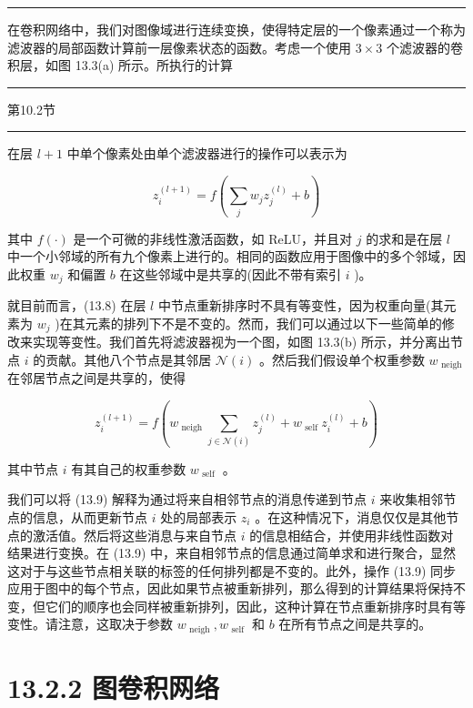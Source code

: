\documentclass[10pt]{article}
\newcommand{\HRule}{\begin{center}\rule{0.9\linewidth}{0.2mm}\end{center}}
\begin{document}
\HRule

在卷积网络中，我们对图像域进行连续变换，使得特定层的一个像素通过一个称为滤波器的局部函数计算前一层像素状态的函数。考虑一个使用 \(3 \times  3\) 个滤波器的卷积层，如图 13.3(a) 所示。所执行的计算

\HRule

第10.2节

\HRule

在层 \(l + 1\) 中单个像素处由单个滤波器进行的操作可以表示为

\[
{z}_{i}^{\left( l + 1\right) } = f\left( {\mathop{\sum }\limits_{j}{w}_{j}{z}_{j}^{\left( l\right) } + b}\right)  \tag{13.8}
\]

其中 \(f\left( \cdot \right)\) 是一个可微的非线性激活函数，如 ReLU，并且对 \(j\) 的求和是在层 \(l\) 中一个小邻域的所有九个像素上进行的。相同的函数应用于图像中的多个邻域，因此权重 \({w}_{j}\) 和偏置 \(b\) 在这些邻域中是共享的(因此不带有索引 \(i\) )。

就目前而言，(13.8) 在层 \(l\) 中节点重新排序时不具有等变性，因为权重向量(其元素为 \({w}_{j}\) )在其元素的排列下不是不变的。然而，我们可以通过以下一些简单的修改来实现等变性。我们首先将滤波器视为一个图，如图 13.3(b) 所示，并分离出节点 \(i\) 的贡献。其他八个节点是其邻居 \(\mathcal{N}\left( i\right)\) 。然后我们假设单个权重参数 \({w}_{\text{ neigh }}\) 在邻居节点之间是共享的，使得

\[
{z}_{i}^{\left( l + 1\right) } = f\left( {{w}_{\text{ neigh }}\mathop{\sum }\limits_{{j \in  \mathcal{N}\left( i\right) }}{z}_{j}^{\left( l\right) } + {w}_{\text{ self }}{z}_{i}^{\left( l\right) } + b}\right)  \tag{13.9}
\]

其中节点 \(i\) 有其自己的权重参数 \({w}_{\text{ self }}\) 。

我们可以将 (13.9) 解释为通过将来自相邻节点的消息传递到节点 \(i\) 来收集相邻节点的信息，从而更新节点 \(i\) 处的局部表示 \({z}_{i}\) 。在这种情况下，消息仅仅是其他节点的激活值。然后将这些消息与来自节点 \(i\) 的信息相结合，并使用非线性函数对结果进行变换。在 (13.9) 中，来自相邻节点的信息通过简单求和进行聚合，显然这对于与这些节点相关联的标签的任何排列都是不变的。此外，操作 (13.9) 同步应用于图中的每个节点，因此如果节点被重新排列，那么得到的计算结果将保持不变，但它们的顺序也会同样被重新排列，因此，这种计算在节点重新排序时具有等变性。请注意，这取决于参数 \({w}_{\text{ neigh }},{w}_{\text{ self }}\) 和 \(b\) 在所有节点之间是共享的。

\section*{13.2.2 图卷积网络}
\end{document}
